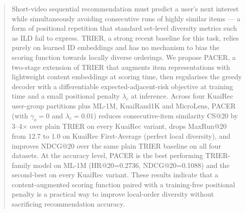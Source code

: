 \begin{abstract}
Short-video sequential recommendation must predict a user's next interest
while simultaneously avoiding consecutive runs of highly similar items ---
a form of positional repetition that standard set-level diversity metrics
such as ILD fail to express. TRIER, a strong recent baseline for this task,
relies purely on learned ID embeddings and has no mechanism to bias the
scoring function towards locally diverse orderings. We propose PACER, a
two-stage extension of TRIER that augments item representations with
lightweight content embeddings at scoring time, then regularises the
greedy decoder with a differentiable expected-adjacent-risk objective at
training time and a small positional penalty $\lambda_c$ at inference.
Across four KuaiRec user-group partitions plus ML-1M, KuaiRand1K and
MicroLens, PACER (with $\gamma_o=0$ and $\lambda_c=0.01$) reduces
consecutive-item similarity CS@20 by 3--4$\times$ over plain TRIER on every
KuaiRec variant, drops MaxRun@20 from 12.7 to 1.0 on KuaiRec
First-Average (perfect local diversity), and improves NDCG@20 over the
same plain TRIER baseline on all four datasets. At the accuracy level,
PACER is the best performing TRIER-family model on ML-1M (HR@20=0.2736,
NDCG@20=0.1088) and the second-best on every KuaiRec variant. These results
indicate that a content-augmented scoring function paired with a
training-free positional penalty is a practical way to improve local-order
diversity without sacrificing recommendation accuracy.
\end{abstract}


